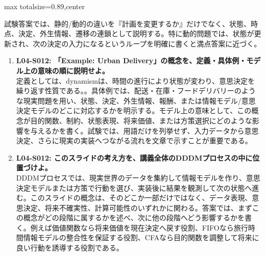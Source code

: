 \begin{minipage}[t]{0.58\textwidth}
\begin{adjustbox}{max totalsize={\textwidth}{0.89\textheight},center}
\begin{minipage}{\textwidth}
試験答案では、静的/動的の違いを『計画を変更するか』だけでなく、状態、時点、決定、外生情報、遷移の連鎖として説明する。特に動的問題では、状態が更新され、次の決定の入力になるというループを明確に書くと満点答案に近づく。\par{}\begin{enumerate}\item \textbf{L04-S012: 「Example: Urban Delivery」の概念を、定義・具体例・モデル上の意味の順に説明せよ。}\\定義としては、dynamismは、時間の進行により状態が変わり、意思決定を繰り返す性質である。。具体例では、配送・在庫・フードデリバリーのような現実問題を用い、状態、決定、外生情報、報酬、または情報モデル/意思決定モデルのどこに対応するかを明示する。モデル上の意味として、この概念が目的関数、制約、状態表現、将来価値、または方策選択にどのような影響を与えるかを書く。試験では、用語だけを列挙せず、入力データから意思決定、さらに現実の実装へつながる流れを文章で示すことが重要である。\item \textbf{L04-S012: このスライドの考え方を、講義全体のDDDMプロセスの中に位置づけよ。}\\DDDMプロセスでは、現実世界のデータを集約して情報モデルを作り、意思決定モデルまたは方策で行動を選び、実装後に結果を観測して次の状態へ進む。このスライドの概念は、そのどこか一部だけではなく、データ表現、意思決定、将来不確実性、計算可能性のいずれかに関わる。答案では、まずこの概念がどの段階に属するかを述べ、次に他の段階へどう影響するかを書く。例えば価値関数なら将来価値を現在決定へ戻す役割、FIFOなら旅行時間情報モデルの整合性を保証する役割、CFAなら目的関数を調整して将来に良い行動を誘導する役割である。\end{enumerate}
\end{minipage}
\end{adjustbox}
\end{minipage}



